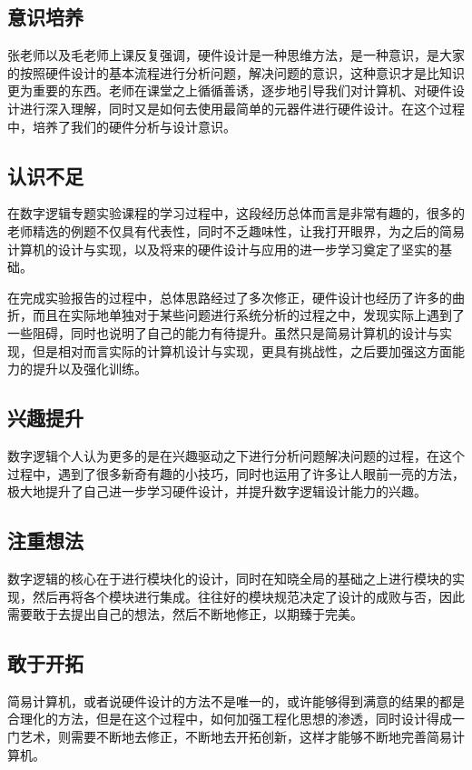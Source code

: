 \documentclass[UTF8]{ctexart}
\begin{document}
   	\subsection{意识培养}
   	张老师以及毛老师上课反复强调，硬件设计是一种思维方法，是一种意识，是大家的按照硬件设计的基本流程进行分析问题，解决问题的意识，这种意识才是比知识更为重要的东西。老师在课堂之上循循善诱，逐步地引导我们对计算机、对硬件设计进行深入理解，同时又是如何去使用最简单的元器件进行硬件设计。在这个过程中，培养了我们的硬件分析与设计意识。

   	\subsection{认识不足}
   	在数字逻辑专题实验课程的学习过程中，这段经历总体而言是非常有趣的，很多的老师精选的例题不仅具有代表性，同时不乏趣味性，让我打开眼界，为之后的简易计算机的设计与实现，以及将来的硬件设计与应用的进一步学习奠定了坚实的基础。

   	在完成实验报告的过程中，总体思路经过了多次修正，硬件设计也经历了许多的曲折，而且在实际地单独对于某些问题进行系统分析的过程之中，发现实际上遇到了一些阻碍，同时也说明了自己的能力有待提升。虽然只是简易计算机的设计与实现，但是相对而言实际的计算机设计与实现，更具有挑战性，之后要加强这方面能力的提升以及强化训练。

   	\subsection{兴趣提升}
   	数字逻辑个人认为更多的是在兴趣驱动之下进行分析问题解决问题的过程，在这个过程中，遇到了很多新奇有趣的小技巧，同时也运用了许多让人眼前一亮的方法，极大地提升了自己进一步学习硬件设计，并提升数字逻辑设计能力的兴趣。

   	\subsection{注重想法}
   	数字逻辑的核心在于进行模块化的设计，同时在知晓全局的基础之上进行模块的实现，然后再将各个模块进行集成。往往好的模块规范决定了设计的成败与否，因此需要敢于去提出自己的想法，然后不断地修正，以期臻于完美。

   	\subsection{敢于开拓}
   简易计算机，或者说硬件设计的方法不是唯一的，或许能够得到满意的结果的都是合理化的方法，但是在这个过程中，如何加强工程化思想的渗透，同时设计得成一门艺术，则需要不断地去修正，不断地去开拓创新，这样才能够不断地完善简易计算机。
\end{document}
